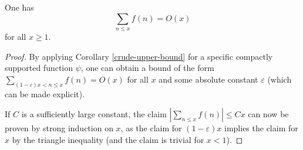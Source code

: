 \begin{corollary}
\label{auto-cheby}
\leanok
One has $$ \sum_{n \leq x} f(n) = O(x)$$ for all $x \geq 1$.
\end{corollary}
\begin{proof}
\leanok
By applying Corollary \ref{crude-upper-bound} for a specific compactly supported function $\psi$,
  one can obtain a bound of the form $\sum_{(1-\varepsilon)x < n \leq x} f(n) = O(x)$ for all $x$
  and some absolute constant $\varepsilon$ (which can be made explicit).

  If $C$ is a sufficiently large constant, the claim $|\sum_{n \leq x} f(n)| \leq Cx$ can now be
  proven by strong induction on $x$, as the claim for $(1-\varepsilon)x$ implies the claim for $x$
  by the triangle inequality (and the claim is trivial for $x < 1$).
\end{proof}
